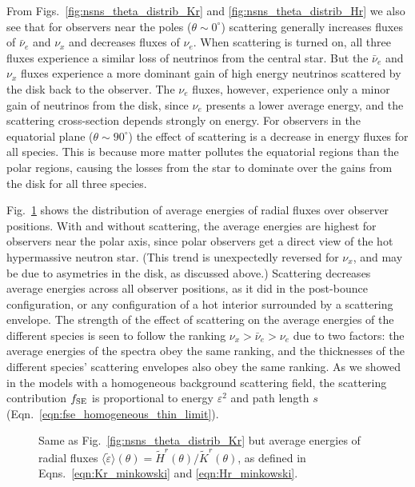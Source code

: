 \documentclass[aps,floatfix,prd,superscriptaddress,twocolumn]{revtex4-1}
\begin{document}
From Figs.~\ref{fig:nsns_theta_distrib_Kr} and \ref{fig:nsns_theta_distrib_Hr}
we also see that for observers near the poles ($\theta \sim 0^\circ$)
scattering generally increases fluxes of $\bar{\nu}_e$ and $\nu_x$
and decreases fluxes of $\nu_e$.
When scattering is turned on, all three fluxes experience a similar
loss of neutrinos from the central star.
But the $\bar{\nu}_e$ and $\nu_x$ fluxes experience a more dominant
gain of high energy neutrinos scattered by the disk back to the observer.
The $\nu_e$ fluxes, however, experience only a minor gain of neutrinos
from the disk, since $\nu_e$ presents a lower average energy,
and the scattering cross-section depends strongly on energy.
For observers in the equatorial plane ($\theta \sim 90^\circ$)
the effect of scattering is a decrease in energy fluxes for all species.
This is because more matter pollutes the equatorial regions than the
polar regions, causing the losses from the star to dominate
over the gains from the disk for all three species.

Fig.~\ref{fig:nsns_theta_distrib_avg_eps} shows the distribution of
average energies of radial fluxes over observer positions.
With and without scattering, the average energies are highest
for observers near the polar axis, since polar observers get a
direct view of the hot hypermassive neutron star.
(This trend is unexpectedly reversed for $\nu_x$,
and may be due to asymetries in the disk, as discussed above.)
Scattering decreases average energies across all observer positions,
as it did in the post-bounce configuration, or any configuration of
a hot interior surrounded by a scattering envelope.
The strength of the effect of scattering on the average energies of
the different species is seen to follow the ranking
$\nu_x>\bar{\nu}_e>\nu_e$ due to two factors:
the average energies of the spectra obey the same ranking,
and the thicknesses of the different species' scattering envelopes
also obey the same ranking.
As we showed in the models with a homogeneous background scattering field,
the scattering contribution $f_{\rm SE}$ is
proportional to energy $\varepsilon^2$ and path length $s$
(Eqn.~\ref{eqn:fse_homogeneous_thin_limit}).
\begin{figure}
  \resizebox{\columnwidth}{!}{}
  \caption{Same as Fig.~\ref{fig:nsns_theta_distrib_Kr} but
    average energies of radial fluxes
    $\langle\tilde{\varepsilon}\rangle(\theta)=\tilde{H}^r(\theta)/\tilde{K}^r(\theta)$,
    as defined in Eqns.~\ref{eqn:Kr_minkowski} and \ref{eqn:Hr_minkowski}.
  }
  \label{fig:nsns_theta_distrib_avg_eps}
\end{figure}
\end{document}
